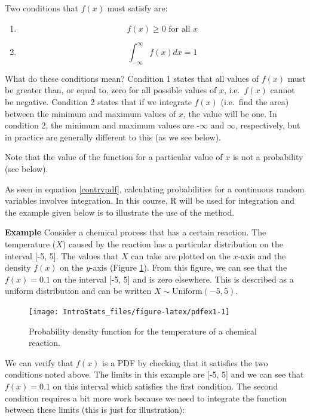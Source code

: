 \documentclass[
  oneside]{krantz}
\begin{document}
Two conditions that \(f(x)\) must satisfy are:

\begin{enumerate}
\def\labelenumi{\arabic{enumi}.}
\item
  \[f(x) \ge 0 \textrm{ for all } x\]
\item
  \[\int _{- \infty}^{\infty} f(x)dx = 1 \]
\end{enumerate}

What do these conditions mean? Condition 1 states that all values of \(f(x)\) must be greater than, or equal to, zero for all possible values of \(x\), i.e.~\(f(x)\) cannot be negative. Condition 2 states that if we integrate \(f(x)\) (i.e.~find the area) between the minimum and maximum values of \(x\), the value will be one. In condition 2, the minimum and maximum values are -\(\infty\) and \(\infty\), respectively, but in practice are generally different to this (as we see below).

Note that the value of the function for a particular value of \(x\) is not a probability (see below).

As seen in equation \ref{contrvpdf}, calculating probabilities for a continuous random variables involves integration. In this course, R will be used for integration and the example given below is to illustrate the use of the method.

\textbf{Example} Consider a chemical process that has a certain reaction. The temperature (\(X\)) caused by the reaction has a particular distribution on the interval {[}-5, 5{]}. The values that \(X\) can take are plotted on the \(x\)-axis and the density \(f(x)\) on the \(y\)-axis (Figure \ref{fig:pdfex1}). From this figure, we can see that the \(f(x)=0.1\) on the interval {[}-5, 5{]} and is zero elsewhere. This is described as a uniform distribution and can be written \(X \sim \textrm{Uniform} (-5, 5)\).

\begin{figure}

{\centering \texttt{[image: IntroStats\_files/figure-latex/pdfex1-1]} 

}

\caption{Probability density function for the temperature of a chemical reaction.}\label{fig:pdfex1}
\end{figure}

We can verify that \(f(x)\) is a PDF by checking that it satisfies the two conditions noted above. The limits in this example are {[}-5, 5{]} and we can see that \(f(x)=0.1\) on this interval which satisfies the first condition. The second condition requires a bit more work because we need to integrate the function between these limits (this is just for illustration):
\end{document}

